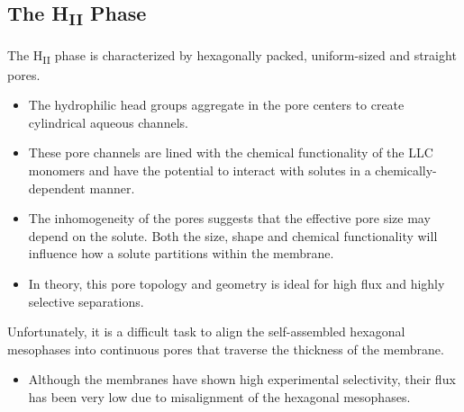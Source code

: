 
  \subsection{The H\textsubscript{II} Phase}
   
  The H\textsubscript{II} phase is characterized by hexagonally packed, uniform-sized
  and straight pores.~\cite{smith_ordered_1997}
  \begin{itemize}
    \item The hydrophilic head groups aggregate in the pore centers to create
    cylindrical aqueous channels. 
    \item These pore channels are lined with the chemical functionality of the LLC monomers
    and have the potential to interact with solutes in a chemically-dependent manner.
    \item The inhomogeneity of the pores suggests that the effective pore size may depend
    on the solute. Both the size, shape and chemical functionality will influence
    how a solute partitions within the membrane. %
    \item In theory, this pore topology and geometry is ideal for high flux and 
    highly selective separations.
  \end{itemize}
  
  Unfortunately, it is a difficult task to align the self-assembled hexagonal
  mesophases into continuous pores that traverse the thickness of the membrane.
  \begin{itemize}
    \item Although the membranes have shown high experimental selectivity, their 
    flux has been very low due to misalignment of the hexagonal mesophases.~\cite{zhou_supported_2005}
  \end{itemize}
  
